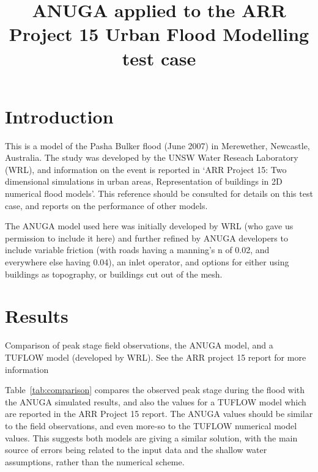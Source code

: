 \documentclass{article}
\begin{document}
\title{ANUGA applied to the ARR Project 15 Urban Flood Modelling test case}

\maketitle

\section{Introduction}
This is a model of the Pasha Bulker flood (June 2007) in Merewether,
Newcastle, Australia. The study was developed by the UNSW Water Reseach Laboratory (WRL),
and information on the event is reported in `ARR Project 15: Two
dimensional simulations in urban areas, Representation of buildings in 2D
numerical flood models'. This reference should be consulted for details on this
test case, and reports on the performance of other models. 

The ANUGA model used here was initially developed by WRL (who gave us permission to
include it here) and further refined by ANUGA developers to include variable
friction (with roads having a manning's n of 0.02, and everywhere else having
0.04), an inlet operator, and options for either using buildings as topography, or
buildings cut out of the mesh.

\section{Results}


\begin{table}[h]
\caption{Comparison of peak stage field observations, the ANUGA model, and a
TUFLOW model (developed by WRL). See the ARR project 15 report for more
information}
\label{tab:comparison}
\begin{center}
\end{center}
\end{table}

Table~\ref{tab:comparison} compares the observed peak stage during the flood with the
ANUGA simulated results, and also the values for a TUFLOW model which are reported in the ARR Project
15 report. The ANUGA values should be similar to the field observations, and
even more-so to the TUFLOW numerical model values. This suggests both models
are giving a similar solution, with the main source of errors being related to
the input data and the shallow water assumptions, rather than the numerical
scheme.
\end{document}
